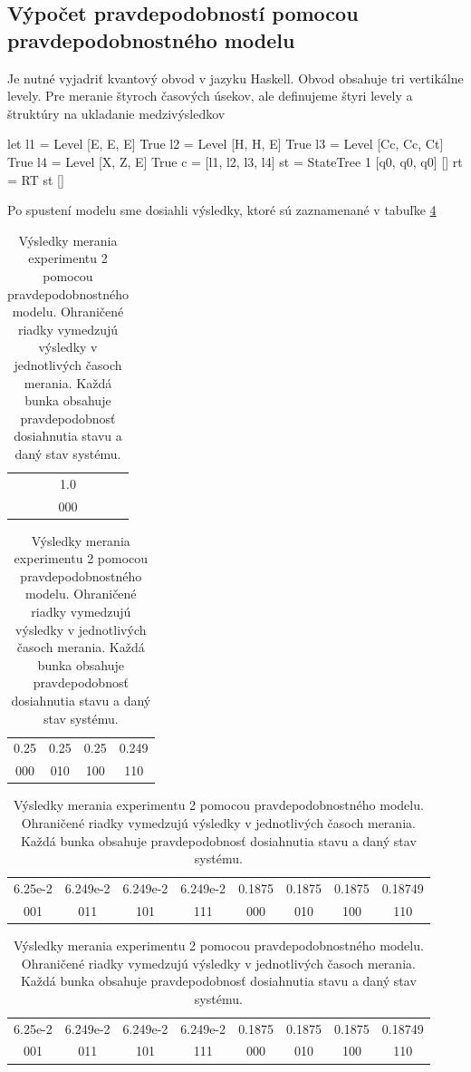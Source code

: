 \subsection*{Výpočet pravdepodobností pomocou pravdepodobnostného modelu}
Je nutné vyjadriť kvantový obvod v jazyku Haskell. Obvod obsahuje tri 
vertikálne levely. Pre meranie štyroch časových úsekov, ale definujeme 
štyri levely a štruktúry na ukladanie medzivýsledkov
\begin{code}
let l1 = Level [E, E, E] True
    l2 = Level [H, H, E] True
    l3 = Level [Cc, Cc, Ct] True
    l4 = Level [X, Z, E] True
    c = [l1, l2, l3, l4]
    st = StateTree 1 [q0, q0, q0] []
    rt = RT st []
\end{code}

Po spustení modelu sme dosiahli výsledky, ktoré sú zaznamenané v tabuľke
\ref{expr2_results}

\begin{table}
\centering
\begin{tabular}{|c|}
\hline
1.0 \\ 
000 \\ 
\hline
\end{tabular}

\begin{tabular}{|c|c|c|c|}
\hline
0.25 & 0.25 & 0.25 & 0.249 \\ 
000 & 010 & 100 & 110 \\ 
\hline
\end{tabular}

\begin{tabular}{|c|c|c|c|c|c|c|c|}
\hline
6.25e-2 & 6.249e-2 & 6.249e-2 & 6.249e-2 & 0.1875 & 0.1875 & 0.1875 & 0.18749 \\ 
001 & 011 & 101 & 111 & 000 & 010 & 100 & 110 \\ 
\hline
\end{tabular}

\begin{tabular}{|c|c|c|c|c|c|c|c|}
\hline
6.25e-2 & 6.249e-2 & 6.249e-2 & 6.249e-2 & 0.1875 & 0.1875 & 0.1875 & 0.18749 \\ 
001 & 011 & 101 & 111 & 000 & 010 & 100 & 110 \\ 
\hline
\end{tabular}

\caption{\label{expr2_results} Výsledky merania experimentu 2 pomocou
pravdepodobnostného modelu. Ohraničené riadky vymedzujú výsledky v jednotlivých
 časoch merania. Každá bunka obsahuje pravdepodobnosť dosiahnutia stavu a 
daný stav systému.}
\end{table}

